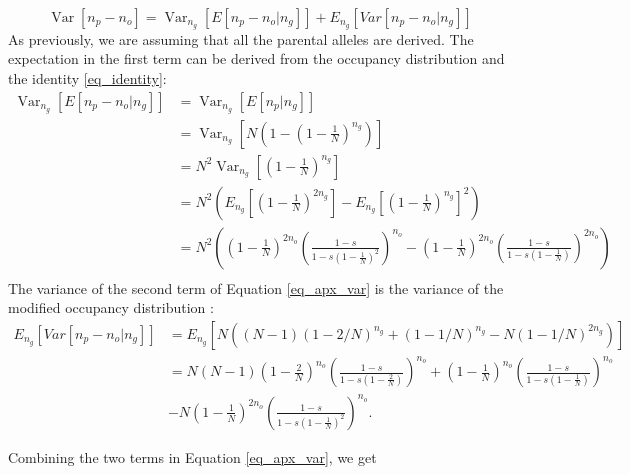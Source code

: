 \documentclass[review]{elsarticle}
\newcommand{\Var}{\operatorname{Var}}
\begin{document}
\begin{equation}
  \label{eq_apx_var}
\Var\left[n_p-n_o \right] = \Var_{n_g}\left[E\left[n_p-n_o | n_g \right]\right]+  E_{n_g}\left[Var\left[n_p-n_o | n_g \right]\right] 
\end{equation}
As previously, we are assuming that all the parental alleles are derived.
The expectation in the first term can be derived from the occupancy distribution and the identity
\ref{eq_identity}:
\begin{equation}
\begin{split}
\Var_{n_g}\left[E\left[n_p-n_o | n_g \right]\right] &= \Var_{n_g}\left[E\left[n_p| n_g \right]\right] \\
&= \Var_{n_g}\left[N\left(1-(1-\frac{1}{N})^{n_g} \right) \right] \\ 
&= N^2 \Var_{n_g}\left[(1-\frac{1}{N})^{n_g} \right] \\
&= N^2 \left( E_{n_g}\left[(1-\frac{1}{N})^{2n_g} \right] - E_{n_g}\left[(1-\frac{1}{N})^{n_g} \right]^2\right) \\
&= N^2 \left( \left(1-\frac{1}{N}\right)^{2n_o} \left(\frac{1-s}{1-s  \left(1-\frac{1}{N}\right)^2}\right)^{n_o} 
-   \left(1-\frac{1}{N}\right)^{2n_o} \left(\frac{1-s}{1-s  \left(1-\frac{1}{N}\right)}\right)^{2n_o} \right) \\
\end{split}
\end{equation}
The variance of the second term of Equation \eqref{eq_apx_var} is the variance of the modified occupancy
distribution \cite{JohnsonEtAl2005}:
\begin{equation}
\begin{split}
E_{n_g}\left[Var\left[n_p-n_o | n_g \right]\right] & = E_{n_g}\left[N ((N - 1) (1 - 2/N)^{n_g} + (1 - 1/N)^{n_g} - N (1 - 1/N)^{2 n_g}) \right] \\
& = N (N-1)  \left(1-\frac{2}{N}\right)^{n_o} \left(\frac{1- s}{1- s  \left(1-\frac{2}{N}\right)}\right)^{n_o} +  \left(1-\frac{1}{N}\right)^{n_o} \left(\frac{1- s}{1- s  \left(1-\frac{1}{N}\right)}\right)^{n_o} \\
&-N  \left(1-\frac{1}{N}\right)^{2n_o} \left(\frac{1-  s}{1- s  \left(1-\frac{1}{N}\right)^2}\right)^{n_o}. 
\end{split}
\end{equation}

Combining the two terms in Equation \eqref{eq_apx_var}, we get

\newcommand{\vara}[1]{\left(1-\frac{#1}{N}\right)}
\newcommand{\varb}[1]{\left(\frac{1-s}{1-s #1}\right)}
\end{document}
